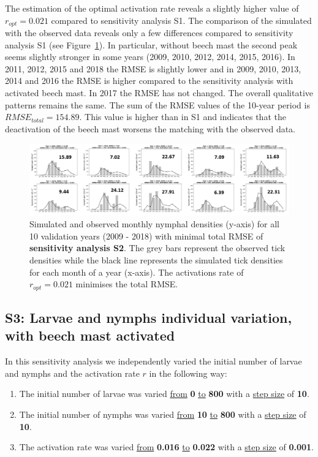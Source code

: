 \documentclass[a4paper, 11pt]{scrartcl}
\begin{document}
The estimation of the optimal activation rate reveals a slightly higher value of $r_{opt} = 0.021$ compared to sensitivity analysis S1. The comparison of the simulated with
the observed data reveals only a few differences compared to sensitivity analysis S1 (see Figure~\ref{fig:initial_ticks_without_beech}). In particular, without beech mast the
second peak seems slightly stronger in some years (2009, 2010, 2012, 2014, 2015, 2016). In 2011, 2012, 2015 and 2018 the RMSE is slightly lower and in 2009, 2010, 2013, 2014
and 2016 the RMSE is higher compared to the sensitivity analysis with activated beech mast. In 2017 the RMSE has not changed. The overall qualitative patterns remains
the same. The sum of the RMSE values of the 10-year period is $RMSE_{total} = 154.89$. This value is higher than in S1 and indicates that the deactivation of the beech mast
worsens the matching with the observed data.
\clearpage

\begin{figure}[h!]
\centering
\includegraphics[width=\linewidth]{figures/initial_ticks_without_beech}
\caption{Simulated and observed monthly nymphal densities (y-axis) for all 10 validation years (2009 - 2018) with minimal total RMSE of \textbf{sensitivity analysis S2}. The
grey bars represent the observed tick densities while the black line represents the simulated tick densities for each month of a year (x-axis). The activations rate of
$r_{opt}= 0.021$ minimises the total RMSE.}
\label{fig:initial_ticks_without_beech}
\end{figure}


\subsection{S3: Larvae and nymphs individual variation, with beech mast activated}
In this sensitivity analysis we independently varied the initial number of larvae and nymphs and the activation rate $r$ in the following way:

\begin{enumerate}
\item The initial number of larvae was varied \underline{from} \textbf{0} \underline{to} \textbf{800} with a \underline{step size} of \textbf{10}.
\item The initial number of nymphs was varied \underline{from} \textbf{10} \underline{to} \textbf{800} with a \underline{step size} of \textbf{10}.
\item The activation rate was varied \underline{from} \textbf{0.016} \underline{to} \textbf{0.022} with a \underline{step size} of \textbf{0.001}.
\end{enumerate}
\end{document}
